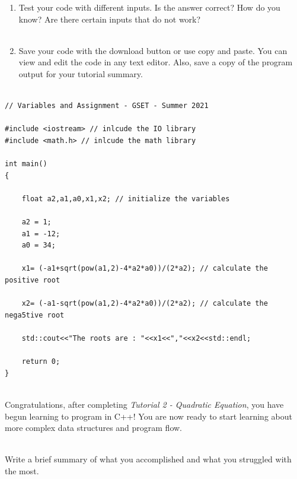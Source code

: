 \documentclass[12pt]{article}
\begin{document}
\begin{description}[labelindent=1cm]
\begin{enumerate}
		\item Test your code with different inputs. Is the answer correct? How do you know? Are there certain inputs that do not work? \\\\
		
	
		\item Save your code with the download button or use copy and paste. You can view and edit the code in any text editor. Also, save a copy of the program output for your tutorial summary. \\\\

	\end{enumerate}

\newpage
\item[\textbf{\underline{Solution Code:}}] \hfill \vspace{0mm}

\begin{lstlisting}
// Variables and Assignment - GSET - Summer 2021 

#include <iostream> // inlcude the IO library
#include <math.h> // inlcude the math library

int main()
{

	float a2,a1,a0,x1,x2; // initialize the variables
	
	a2 = 1;
	a1 = -12;
	a0 = 34;
	
	x1= (-a1+sqrt(pow(a1,2)-4*a2*a0))/(2*a2); // calculate the positive root
	
	x2= (-a1-sqrt(pow(a1,2)-4*a2*a0))/(2*a2); // calculate the nega5tive root
	
	std::cout<<"The roots are : "<<x1<<","<<x2<<std::endl;
	
	return 0;
}
\end{lstlisting}

\item[\textbf{\underline{Tutorial Complete:}}] \hfill \vspace{3mm}\\ 
	Congratulations, after completing {\it Tutorial 2 - Quadratic Equation}, you have begun learning to program in C++! You are now ready to start learning about more complex data structures and program flow. \\


\newpage
\item[\textbf{\underline{Tutorial Summary:}}] \hfill \vspace{3mm}\\ 
Write a brief summary of what you accomplished and what you struggled with the most. 


\end{description}
\end{document}
